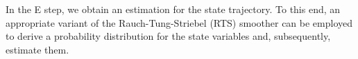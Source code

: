 % 
In the E step, we obtain an estimation for the state trajectory. To this end, an appropriate variant of the Rauch-Tung-Striebel (RTS) smoother can be employed to derive a probability distribution for the state variables and, subsequently, estimate them.
% 
% 
% 
% 
% 
%
